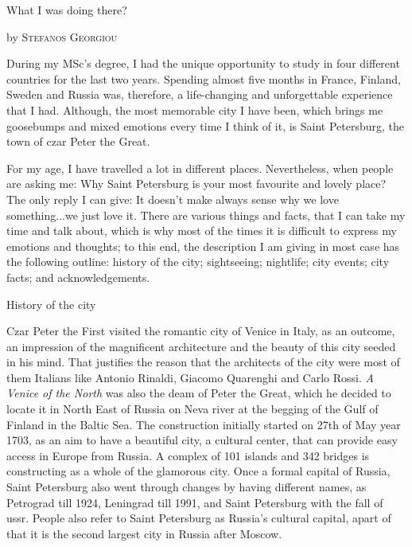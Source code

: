\documentclass[10pt,a4paper]{article} %
\newcommand{\NewsItem}[1]{ %
\usefont{T1}{fvs}{n}{n} %
\vspace{24pt}\large #1\vspace{3pt} %
\par \normalsize \normalfont}
\newcommand{\NewsAuthor}[1]{ %
\hfill by \textsc{#1} \vspace{20pt} %
\par \normalfont}
\begin{document}
\begin{multicols}{3} %


\NewsItem{What I was doing there?}
\NewsAuthor{Stefanos Georgiou}\begin{flushleft}
	
\end{flushleft}
During my MSc's degree, I had the unique opportunity to study
in four different countries for the last two years.
Spending almost five months in France, Finland, Sweden and Russia was,
therefore, a life-changing and unforgettable experience that I had.
Although, the most memorable city I have been, which brings me goosebumps
and mixed emotions every time I think of it, is Saint Petersburg,
the town of czar Peter the Great.

For my age, I have travelled a lot in different places.
Nevertheless, when people are asking me: Why Saint Petersburg is your most favourite and lovely place?
The only reply I can give: It doesn't make always sense why we love something...we just love it.
There are various things and facts, that I can take my time and talk about,
which is why most of the times it is difficult to express my emotions and thoughts;
to this end, the description I am giving in most case has the following outline:
history of the city; sightseeing; nightlife; city events; city facts; and acknowledgements.

\NewsItem{History of the city}
Czar Peter the First visited the romantic city of Venice in Italy, as an outcome, 
an impression of the magnificent architecture and the beauty of this city 
seeded in his mind. 
That justifies the reason that the architects of the city were most of them Italians 
like Antonio Rinaldi, Giacomo Quarenghi and Carlo Rossi. 
\textit{A Venice of the North} was also the deam of Peter the Great, 
which he decided to locate it in North East of Russia on Neva river 
at the begging of the Gulf of Finland in the Baltic Sea. 
The construction initially started on 27th of May year 1703, 
as an aim to have a beautiful city, a cultural center, 
that can provide easy access in Europe from Russia. 
A complex of 101 islands and 342 bridges is constructing as a whole of the glamorous city. 
Once a formal capital of Russia, Saint Petersburg also went through 
changes by having different names, as Petrograd till 1924, Leningrad till 1991, 
and Saint Petersburg with the fall of {\sc ussr}. 
People also refer to Saint Petersburg as Russia's cultural capital, 
apart of that it is the second largest city in Russia after Moscow.

\end{multicols} %
\end{document}
